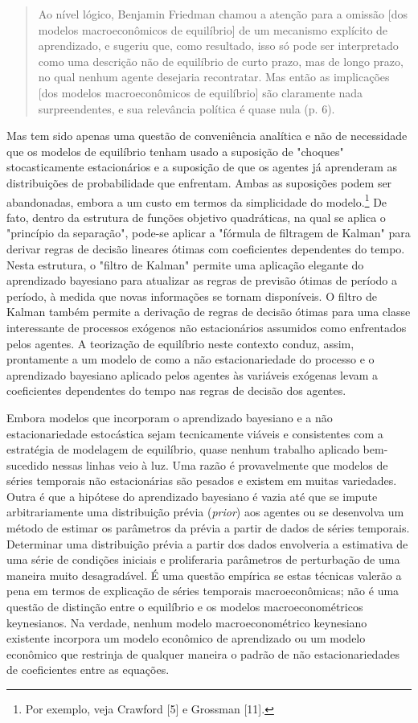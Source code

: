 \documentclass[12pt]{article}
\begin{document}
\begin{quote}
    Ao nível lógico, Benjamin Friedman chamou a atenção para a omissão [dos modelos macroeconômicos de equilíbrio] de um mecanismo explícito de aprendizado, e sugeriu que, como resultado, isso só pode ser interpretado como uma descrição não de equilíbrio de curto prazo, mas de longo prazo, no qual nenhum agente desejaria recontratar. Mas então as implicações [dos modelos macroeconômicos de equilíbrio] são claramente nada surpreendentes, e sua relevância política é quase nula (p. 6).
\end{quote}

Mas tem sido apenas uma questão de conveniência analítica e não de necessidade que os modelos de equilíbrio tenham usado a suposição de "choques" stocasticamente estacionários e a suposição de que os agentes já aprenderam as distribuições de probabilidade que enfrentam. Ambas as suposições podem ser abandonadas, embora a um custo em termos da simplicidade do modelo.\footnote{Por exemplo, veja Crawford [5] e Grossman [11].} De fato, dentro da estrutura de funções objetivo quadráticas, na qual se aplica o "princípio da separação", pode-se aplicar a "fórmula de filtragem de Kalman" para derivar regras de decisão lineares ótimas com coeficientes dependentes do tempo. Nesta estrutura, o "filtro de Kalman" permite uma aplicação elegante do aprendizado bayesiano para atualizar as regras de previsão ótimas de período a período, à medida que novas informações se tornam disponíveis. O filtro de Kalman também permite a derivação de regras de decisão ótimas para uma classe interessante de processos exógenos não estacionários assumidos como enfrentados pelos agentes. A teorização de equilíbrio neste contexto conduz, assim, prontamente a um modelo de como a não estacionariedade do processo e o aprendizado bayesiano aplicado pelos agentes às variáveis exógenas levam a coeficientes dependentes do tempo nas regras de decisão dos agentes.

Embora modelos que incorporam o aprendizado bayesiano e a não estacionariedade estocástica sejam tecnicamente viáveis e consistentes com a estratégia de modelagem de equilíbrio, quase nenhum trabalho aplicado bem-sucedido nessas linhas veio à luz. Uma razão é provavelmente que modelos de séries temporais não estacionárias são pesados e existem em muitas variedades. Outra é que a hipótese do aprendizado bayesiano é vazia até que se impute arbitrariamente uma distribuição prévia (\textit{prior}) aos agentes ou se desenvolva um método de estimar os parâmetros da prévia a partir de dados de séries temporais. Determinar uma distribuição prévia a partir dos dados envolveria a estimativa de uma série de condições iniciais e proliferaria parâmetros de perturbação de uma maneira muito desagradável. É uma questão empírica se estas técnicas valerão a pena em termos de explicação de séries temporais macroeconômicas; não é uma questão de distinção entre o equilíbrio e os modelos macroeconométricos keynesianos. Na verdade, nenhum modelo macroeconométrico keynesiano existente incorpora um modelo econômico de aprendizado ou um modelo econômico que restrinja de qualquer maneira o padrão de não estacionariedades de coeficientes entre as equações.
\end{document}
